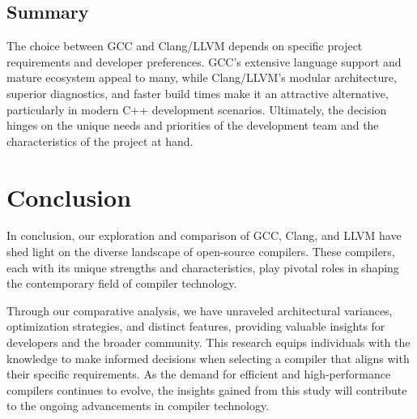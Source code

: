 \documentclass[conference]{IEEEtran}
\begin{document}
\subsection{Summary}

The choice between GCC and Clang/LLVM depends on specific project requirements and developer preferences. GCC's extensive language support and mature ecosystem appeal to many, while Clang/LLVM's modular architecture, superior diagnostics, and faster build times make it an attractive alternative, particularly in modern C++ development scenarios. Ultimately, the decision hinges on the unique needs and priorities of the development team and the characteristics of the project at hand.

\section{Conclusion}

In conclusion, our exploration and comparison of GCC, Clang, and LLVM have shed light on the diverse landscape of open-source compilers. These compilers, each with its unique strengths and characteristics, play pivotal roles in shaping the contemporary field of compiler technology.

Through our comparative analysis, we have unraveled architectural variances, optimization strategies, and distinct features, providing valuable insights for developers and the broader community. This research equips individuals with the knowledge to make informed decisions when selecting a compiler that aligns with their specific requirements. As the demand for efficient and high-performance compilers continues to evolve, the insights gained from this study will contribute to the ongoing advancements in compiler technology.
\end{document}
